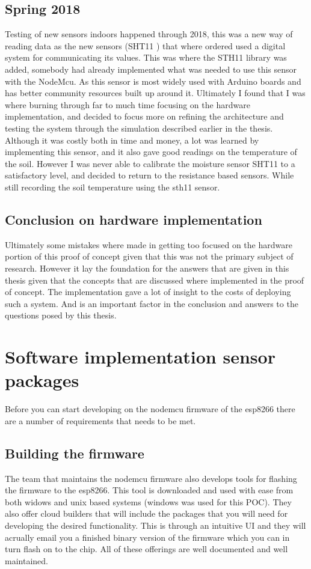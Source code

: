 \documentclass[]{uiophd}
\begin{document}
\subsection{Spring 2018}
Testing of new sensors indoors happened through 2018, this was a new way of reading data as the new sensors (SHT11 \cite{sensorion}) that where ordered used a digital system for communicating its values. This was where the STH11 library was added, somebody had already implemented what was needed to use this sensor with the NodeMcu. As this sensor is most widely used with Arduino boards and has better community resources built up around it. Ultimately I found that I was where burning through far to much time focusing on the hardware implementation, and decided to focus more on refining the architecture and testing the system through the simulation described earlier in the thesis. Although it was costly both in time and money, a lot was learned by implementing this sensor, and it also gave good readings on the temperature of the soil. However I was never able to calibrate the moisture sensor SHT11 to a satisfactory level, and decided to return to the resistance based sensors. While still recording the soil temperature using the sth11 sensor. 
\subsection{Conclusion on hardware implementation}
Ultimately some mistakes where made in getting too focused on the hardware portion of this proof of concept given that this was not the primary subject of research. However it lay the foundation for the answers that are given in this thesis given that the concepts that are discussed where implemented in the proof of concept. The implementation gave a lot of insight to the costs of deploying such a system. And is an important factor in the conclusion and answers to the questions posed by this thesis.
\section{Software implementation sensor packages}
Before you can start developing on the nodemcu firmware of the esp8266 there are a number of requirements that needs to be met.
\subsection{Building the firmware}
The team that maintains the nodemcu firmware also develops tools for flashing the firmware to the esp8266. This tool is downloaded and used with ease from both widows and unix based systems (windows was used for this POC). They also offer cloud builders that will include the packages that you will need for developing the desired functionality. This is through an intuitive UI and they will acrually email you a finished binary version of the firmware which you can in turn flash on to the chip. All of these offerings are well documented and well maintained.
\end{document}
